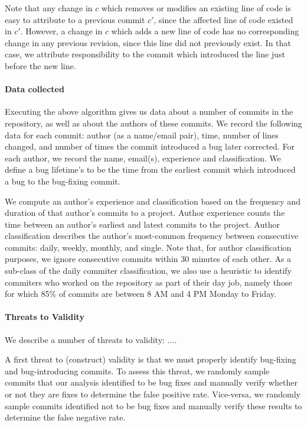Note that any change in $c$ which removes or modifies an existing line
of code is easy to attribute to a previous commit $c'$, since the
affected line of code existed in $c'$. However, a change in $c$ which
adds a new line of code has no corresponding change in any previous
revision, since this line did not previously exist. In that case, we
attribute responsibility to the commit which introduced the line just
before the new line.

\paragraph{Data collected}
Executing the above algorithm gives us data about a number of commits
in the repository, as well as about the authors of these commits.  We
record the following data for each commit: author (as a name/email
pair), time, number of lines changed, and number of times the commit
introduced a bug later corrected. For each author, we record the name,
email(s), experience and classification. We define a bug lifetime's to
be the time from the earliest commit which introduced a bug to the
bug-fixing commit.

We compute an author's experience and classification based on the
frequency and duration of that author's commits to a project. Author
experience counts the time between an author's earliest and latest
commits to the project. Author classification describes the author's
most-common frequency between consecutive commits: daily, weekly,
monthly, and single. Note that, for author classification purposes, we
ignore consecutive commits within 30 minutes of each other. As a
sub-class of the daily commiter classification, we also use a
heuristic to identify commiters who worked on the repository as part
of their day job, namely those for which 85\% of commits are between 8
AM and 4 PM Monday to Friday.

\paragraph{Threats to Validity}
We describe a number of threats to validity: ....

A first threat to (construct) validity is that we must properly
identify bug-fixing and bug-introducing commits. To assess this
threat, we randomly sample commits that our analysis identified to be
bug fixes and manually verify whether or not they are fixes to
determine the false positive rate. Vice-versa, we randomly sample
commits identified not to be bug fixes and manually verify these
results to determine the false negative rate.

